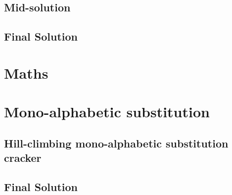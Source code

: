 \documentclass[pdftex, 12pt, a4paper]{article}
\begin{document}
\subsection{Mid-solution}\label{last-byte-out}

\subsection{Final Solution}\label{q1-solution}

\section{Maths}
\pagebreak

\section{Mono-alphabetic substitution}
\subsection{Hill-climbing mono-alphabetic substitution cracker}\label{break-simplesub}


\subsection{Final Solution}\label{q3-solution}
\pagebreak
\end{document}

